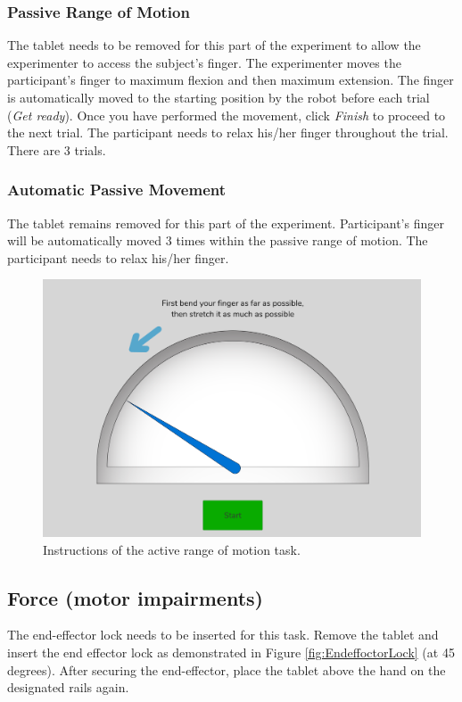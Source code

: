 \documentclass[10pt,oneside,a4paper]{article}
\begin{document}
\subsubsection*{Passive Range of Motion}
The tablet needs to be removed for this part of the experiment to allow the experimenter to access the subject’s finger. The experimenter moves the participant’s finger to maximum flexion and then maximum extension. The finger is automatically moved to the starting position by the robot before each trial (\emph{Get ready}). Once you have performed the movement, click \emph{Finish} to proceed to the next trial. The participant needs to relax his/her finger throughout the trial. There are 3 trials.

\subsubsection*{Automatic Passive Movement}
The tablet remains removed for this part of the experiment. Participant’s finger will be automatically moved 3 times within the passive range of motion. The participant needs to relax his/her finger. 

\begin{figure}[h!]
\begin{center}
\includegraphics[width=\columnwidth]{images/Assessments/RangeOfMotion.png}
\caption{Instructions of the active range of motion task. }
\label{fig:ROM}
\end{center}
\end{figure}

\subsection{Force (motor impairments)}
The end-effector lock needs to be inserted for this task. Remove the tablet and insert the end effector lock as demonstrated in Figure \ref{fig:EndeffoctorLock} (at 45 degrees). After securing the end-effector, place the tablet above the hand on the designated rails again. \\
\end{document}
